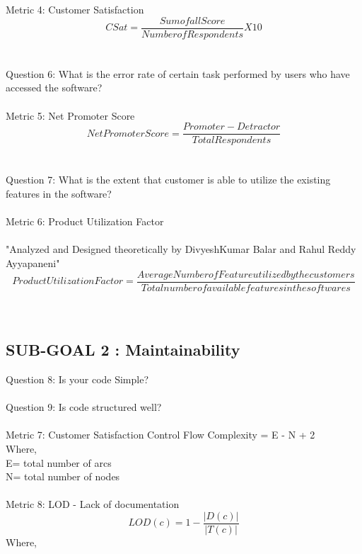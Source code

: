 \documentclass[a4paper, 11pt]{article}
\begin{document}
Metric 4: Customer Satisfaction\cite{11}
\begin{equation*}
    CSat = \frac{Sum of all Score}{Number of Respondents}X10
\end{equation*}\\ \\
Question 6: What is the error rate of certain task performed by users who have accessed the software?\\  \\
Metric 5: Net Promoter Score\cite{11}
\begin{equation*}
    Net Promoter Score = \frac{Promoter-Detractor}{Total Respondents}
\end{equation*}\\ \\
Question 7: What is the extent that customer is able to utilize the existing features in the software?\\ \\
Metric 6: Product Utilization Factor\\ \\
"Analyzed and Designed theoretically by DivyeshKumar Balar and Rahul Reddy Ayyapaneni"
\begin{equation*}
    Product Utilization Factor = \frac{Average Number of Feature utilized by the customers}{Total number of available features in the softwares}
\end{equation*}\\ \\

\subsection{SUB-GOAL 2 : Maintainability}

Question 8: Is your code Simple?\\  \\
Question 9: Is code structured well?\\ \\
Metric 7: Customer Satisfaction
Control Flow Complexity = E - N + 2\\
	Where, \\
		E= total number of arcs\\
		N= total number of nodes
\\ \\
Metric 8: LOD - Lack of documentation\cite{10}
\begin{equation*}
     LOD(c) = 1 - \frac{|D(c)|}{|T(c)|}
 \end{equation*}
 Where,
 
\end{document}
